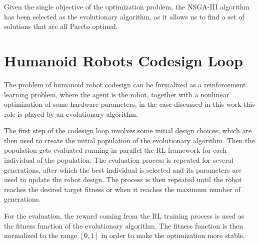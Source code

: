 Given the single objective of the optimization problem, the \ac{NSGA}-III algorithm has been selected as the evolutionary algorithm, as it allows us to find a set of solutions that are all Pareto optimal.


\section{Humanoid Robots Codesign Loop}
\label{sec:Codesign}

The problem of humanoid robot codesign can be formalized as a reinforcement learning problem, where the agent is the robot, together with a nonlinear optimization of some hardware parameters, in the case discussed in this work this role is played by an evolutionary algorithm.

The first step of the codesign loop involves some initial design choices, which are then used to create the initial population of the evolutionary algorithm. Then the population gets evaluated running in parallel the \ac{RL} framework for each individual of the population. The evaluation process is repeated for several generations, after which the best individual is selected and its parameters are used to update the robot design. The process is then repeated until the robot reaches the desired target fitness or when it reaches the maximum number of generations.

For the evaluation, the reward coming from the \ac{RL} training process is used as the fitness function of the evolutionary algorithm. The fitness function is then normalized to the range $[0,1]$ in order to make the optimization more stable.
